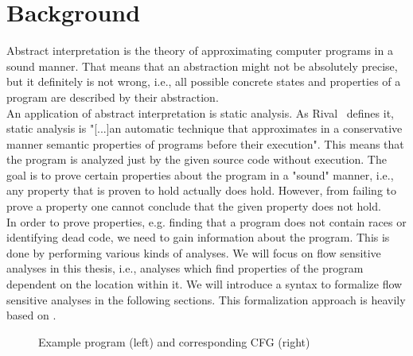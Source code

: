 
\chapter{Background}\label{chapter:background}
  Abstract interpretation is the theory of approximating computer programs in a sound manner. That means that an abstraction might not be absolutely precise, but it definitely is not wrong, i.e., all possible concrete states and properties of a program are described by their abstraction.\\
  An application of abstract interpretation is static analysis. As Rival~\parencite{rival2020introduction} defines it, static analysis is "[...]an automatic technique that approximates in a conservative manner semantic properties of programs before their execution". This means that the program is analyzed just by the given source code without execution. The goal is to prove certain properties about the program in a "sound" manner, i.e., any property that is proven to hold actually does hold. However, from failing to prove a property one cannot conclude that the given property does not hold.\\
  In order to prove properties, e.g. finding that a program does not contain races or identifying dead code, we need to gain information about the program. This is done by performing various kinds of analyses. We will focus on flow sensitive analyses in this thesis, i.e., analyses which find properties of the program dependent on the location within it. We will introduce a syntax to formalize flow sensitive analyses in the following sections. This formalization approach is heavily based on \parencite{apinis2012side}.

\begin{figure}
  \centering
  \begin{subfigure}{.35\textwidth}
    \centering
    
  \end{subfigure}
  \begin{subfigure}{.35\textwidth}
    \centering
  \end{subfigure}
  \caption{Example program (left) and corresponding CFG (right)}
  \label{fig:example_cfg}
\end{figure}
  
